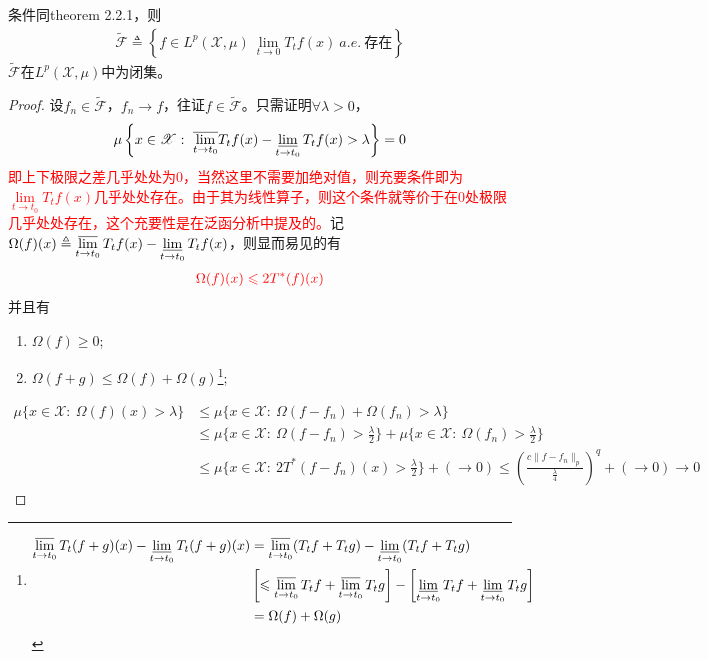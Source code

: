 \begin{theorem}
    条件同theorem 2.2.1，则
    \begin{align*}
        \widetilde{\mathcal{F}} \triangleq \left\lbrace f\in L^p(\mathscr{X},\mu)\  \lim\limits_{t\to 0} T_t f(x)\ a.e.\ \text{存在}\right\rbrace
    \end{align*}
    $\widetilde{\mathcal{F}}$在$L^p(\mathscr{X},\mu)$中为闭集。
\end{theorem}
\begin{proof}
    设$f_n\in\widetilde{\mathcal{F}}$，$f_n\to f$，往证$f\in\widetilde{\mathcal{F}}$。只需证明$\forall \lambda>0$，
    \begin{align*}
        \mu\left\lbrace x\in\mathscr{X}: \ \overline{\lim\limits_{t\to t_0}} T_tf(x) - \varliminf\limits_{t\to t_0} T_t f(x) > \lambda\right\rbrace = 0
    \end{align*}
    \textcolor{red}{即上下极限之差几乎处处为$0$，当然这里不需要加绝对值，则充要条件即为$\lim\limits_{t\to t_0} T_t f(x)$几乎处处存在。由于其为线性算子，则这个条件就等价于在$0$处极限几乎处处存在，这个充要性是在泛函分析中提及的。}记$\Omega(f)(x)\triangleq \varlimsup\limits_{t\to t_0}T_tf(x) - \varliminf\limits_{t\to t_0} T_t f(x)$，则显而易见的有
    \begin{align*}
        \color{red} \Omega(f)(x) \leqslant 2T^*(f)(x)
    \end{align*}
    并且有
    \begin{enumerate}[leftmargin=1cm, label=\arabic*.]
        \item $\Omega(f) \geqslant 0$;
        \item $\Omega(f+g) \leqslant \Omega(f) + \Omega(g)$\footnote{\begin{align*}
            \varlimsup\limits_{t\to t_0}T_t(f+g)(x) - \varliminf\limits_{t\to t_0} T_t (f+g)(x) &= \varlimsup\limits_{t\to t_0} (T_t f + T_t g) - \varliminf\limits_{t\to t_0} (T_t f + T_t g) \\
            & \left[\leqslant \varlimsup\limits_{t\to t_0}  T_t f + \varlimsup\limits_{t\to t_0} T_t g \right]- \left[\varliminf\limits_{t\to t_0} T_t f + \varliminf\limits_{t\to t_0} T_t g\right] \\
            & = \Omega(f) + \Omega(g)
        \end{align*}};
    \end{enumerate}

    \begin{align*}
        \mu\{x\in\mathscr{X}:\ \Omega(f)(x) > \lambda\} &\leqslant \mu  \{ x\in\mathscr{X}:\ \Omega(f-f_n) + \Omega(f_n) > \lambda \} \\
        & \leqslant \mu \{x\in\mathscr{X}:\ \Omega(f-f_n) > \frac{\lambda}{2} \} + \mu \{x\in\mathscr{X}:\ \Omega(f_n) > \frac{\lambda}{2} \} \\
        & \leqslant \mu \{x\in\mathscr{X}:\ 2T^*(f-f_n)(x) > \frac{\lambda}{2} \} + (\to 0) \leqslant \left(\frac{c\|f-f_n\|_p}{\frac{\lambda}{4}}\right)^q + (\to 0) \to 0
    \end{align*}
\end{proof}

